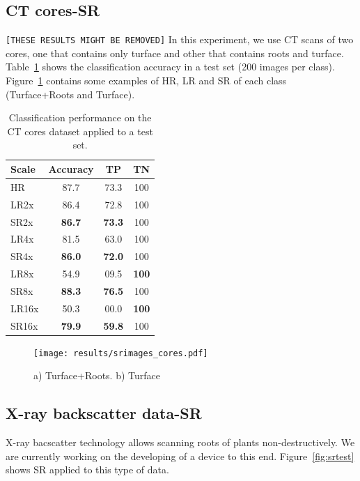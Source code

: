 \documentclass[10pt,twocolumn,letterpaper]{article}
\begin{document}
\subsection{CT cores-SR}
\texttt{[THESE RESULTS MIGHT BE REMOVED]}
In this experiment, we use CT scans of two cores, one that contains only turface and other that contains roots and turface. Table~\ref{tab:results_cores} shows the classification accuracy in a test set (200 images per class). Figure~\ref{fig:srimages_cores} contains some examples of HR, LR and SR of each class (Turface+Roots and Turface).

\begin{table}[h]
\caption{Classification performance on the CT cores dataset applied to a test set.}
\label{tab:results_cores}
\centering
\begin{tabular}{|l|c|c|c|}
\hline
  Scale   & Accuracy & TP & TN \\
\hline
\hline
HR & 87.7 & 73.3 & 100 \\
\hline
LR2x & 86.4 & 72.8 & 100 \\
SR2x & \textbf{86.7} & \textbf{73.3} & 100 \\
\hline
LR4x & 81.5 & 63.0 & 100 \\
SR4x & \textbf{86.0} & \textbf{72.0} & 100 \\
\hline
LR8x & 54.9 & 09.5 & \textbf{100} \\
SR8x & \textbf{88.3} & \textbf{76.5} & 100 \\
\hline
LR16x & 50.3 & 00.0 & \textbf{100} \\
SR16x & \textbf{79.9} & \textbf{59.8} & 100 \\
\hline
\end{tabular}
\end{table}

\begin{figure}[h]
\begin{center}
\texttt{[image: results/srimages\_cores.pdf]}
\end{center}
   \caption{a) Turface+Roots. b) Turface}
\label{fig:srimages_cores}
\end{figure}

\subsection{X-ray backscatter data-SR}

X-ray bacscatter technology allows scanning roots of plants non-destructively. We are currently working on the developing of a device to this end. Figure~\ref{fig:srtest} shows SR applied to this type of data.
\end{document}
